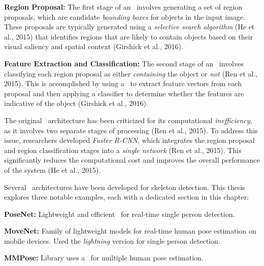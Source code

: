 \startitemize[1]
    \item {\bf Region Proposal:} The first stage of an \RCNN\ involves generating a set of region proposals, which are candidate {\em bounding boxes} for objects in the input image. These proposals are typically generated using a {\em selective search algorithm} (\scc He et al., 2015) that identifies regions that are likely to contain objects based on their visual saliency and spatial context (\scc Girshick et al., 2016).
    \item {\bf Feature Extraction and Classification:} The second stage of an \RCNN\ involves classifying each region proposal as either {\em containing} the object or {\em not} (\scc Ren et al., 2015). This is accomplished by using a \CNN\ to extract feature vectors from each proposal and then applying a classifier to determine whether the features are indicative of the object (\scc Girshick et al., 2016).
\stopitemize

The original \RCNN\ architecture has been criticized for its computational {\em inefficiency}, as it involves two separate stages of processing (\scc Ren et al., 2015). To address this issue, researchers developed {\em Faster R-CNN}, which integrates the region proposal and region classification stages into a {\em single network} (\scc Ren et al., 2015). This significantly reduces the computational cost and improves the overall performance of the system (\scc He et al., 2015).

Several \NN\ architectures have been developed for skeleton detection. This thesis explores three notable examples, each with a dedicated section in this chapter:

\startitemize[n]
    \item {\bf PoseNet:} Lightweight and efficient \CNN\ for real-time single person detection.
    \item {\bf MoveNet:} Family of lightweight models for real-time human pose estimation on mobile devices. Used the {\em lightning} version for single person detection.
    \item {\bf MMPose:} Library uses a \CNN\ for multiple human pose estimation.
\stopitemize



